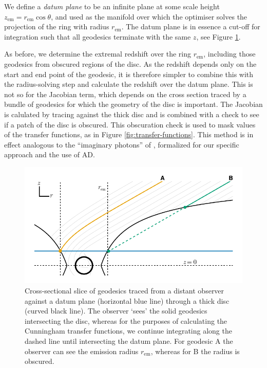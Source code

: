 \documentclass[fleqn,usenatbib]{mnras}
\newcommand{\rhoem}{r_\text{em}}
\begin{document}
We define a \emph{datum plane} to be an infinite plane at some scale height
$z_\text{em} = \rhoem \cos \theta$, and used as the manifold over which the
optimiser solves the projection of the ring with radius $\rhoem$. The datum
plane is in essence a cut-off for integration such that all geodesics terminate
with the same $z$, see Figure \ref{fig:datum-plane-tracing}.

As before, we determine the extremal redshift over the ring $\rhoem$, including
those geodesics from obscured regions of the disc. As the redshift depends only
on the start and end point of the geodesic, it is therefore simpler to combine
this with the radius-solving step and calculate the redshift over the datum
plane. This is not so for the Jacobian term, which depends on the cross section
traced by a bundle of geodesics for which the geometry of the disc is important.
The Jacobian is calulated by tracing against the thick disc and is combined with
a check to see if a patch of the disc is obscured. This obscuration check is
used to mask values of the transfer functions, as in Figure
\ref{fig:transfer-functions}. This method is in effect analogous to the
``imaginary photons'' of \cite{abdikamalov_testing_2020}, formalized for our
specific approach and the use of AD.

\begin{figure}
    \centering
    \includegraphics[width=0.95\columnwidth]{figures/datum-plane.pdf}
    \caption{Cross-sectional slice of geodesics traced from a distant observer
        against a datum plane (horizontal blue line) through a thick disc
        (curved black line). The observer `sees' the solid geodesics
        intersecting the disc, whereas for the purposes of calculating the
        Cunningham transfer functions, we continue integrating along the dashed
        line until intersecting the datum plane. For geodesic A the observer
        can see the emission radius $\rhoem$, whereas for B the radius is
        obscured.
}
    \label{fig:datum-plane-tracing}
\end{figure}
\end{document}
